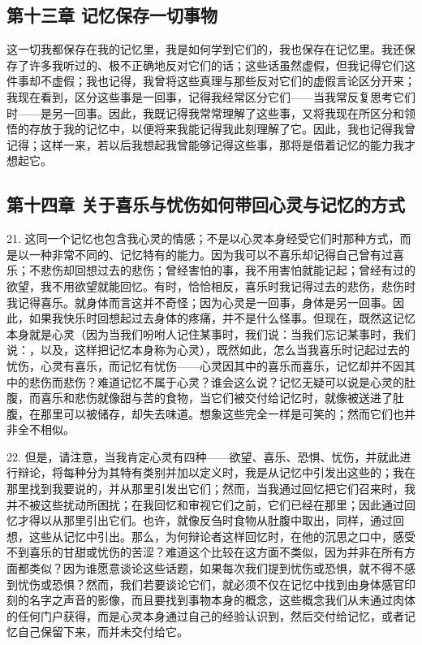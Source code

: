 \subsection{第十三章 记忆保存一切事物}

这一切我都保存在我的记忆里，我是如何学到它们的，我也保存在记忆里。我还保存了许多我听过的、极不正确地反对它们的话；这些话虽然虚假，但我记得它们这件事却不虚假；我也记得，我曾将这些真理与那些反对它们的虚假言论区分开来；我现在看到，区分这些事是一回事，记得我经常区分它们——当我常反复思考它们时——是另一回事。因此，我既记得我常常理解了这些事，又将我现在所区分和领悟的存放于我的记忆中，以便将来我能记得我此刻理解了它。因此，我也记得我曾记得；这样一来，若以后我想起我曾能够记得这些事，那将是借着记忆的能力我才想起它。\par


\subsection{第十四章 关于喜乐与忧伤如何带回心灵与记忆的方式}

21. 这同一个记忆也包含我心灵的情感；不是以心灵本身经受它们时那种方式，而是以一种非常不同的、记忆特有的能力。因为我可以不喜乐却记得自己曾有过喜乐；不悲伤却回想过去的悲伤；曾经害怕的事，我不用害怕就能记起；曾经有过的欲望，我不用欲望就能回忆。有时，恰恰相反，喜乐时我记得过去的悲伤，悲伤时我记得喜乐。就身体而言这并不奇怪；因为心灵是一回事，身体是另一回事。因此，如果我快乐时回想起过去身体的疼痛，并不是什么怪事。但现在，既然这记忆本身就是心灵（因为当我们吩咐人记住某事时，我们说：当我们忘记某事时，我们说：，以及，这样把记忆本身称为心灵），既然如此，怎么当我喜乐时记起过去的忧伤，心灵有喜乐，而记忆有忧伤——心灵因其中的喜乐而喜乐，记忆却并不因其中的悲伤而悲伤？难道记忆不属于心灵？谁会这么说？记忆无疑可以说是心灵的肚腹，而喜乐和悲伤就像甜与苦的食物，当它们被交付给记忆时，就像被送进了肚腹，在那里可以被储存，却失去味道。想象这些完全一样是可笑的；然而它们也并非全不相似。\par

22. 但是，请注意，当我肯定心灵有四种——欲望、喜乐、恐惧、忧伤，并就此进行辩论，将每种分为其特有类别并加以定义时，我是从记忆中引发出这些的；我在那里找到我要说的，并从那里引发出它们；然而，当我通过回忆把它们召来时，我并不被这些扰动所困扰；在我回忆和审视它们之前，它们已经在那里；因此通过回忆才得以从那里引出它们。也许，就像反刍时食物从肚腹中取出，同样，通过回想，这些从记忆中引出。那么，为何辩论者这样回忆时，在他的沉思之口中，感受不到喜乐的甘甜或忧伤的苦涩？难道这个比较在这方面不类似，因为并非在所有方面都类似？因为谁愿意谈论这些话题，如果每次我们提到忧伤或恐惧，就不得不感到忧伤或恐惧？然而，我们若要谈论它们，就必须不仅在记忆中找到由身体感官印刻的名字之声音的影像，而且要找到事物本身的概念，这些概念我们从未通过肉体的任何门户获得，而是心灵本身通过自己的经验认识到，然后交付给记忆，或者记忆自己保留下来，而并未交付给它。\par

